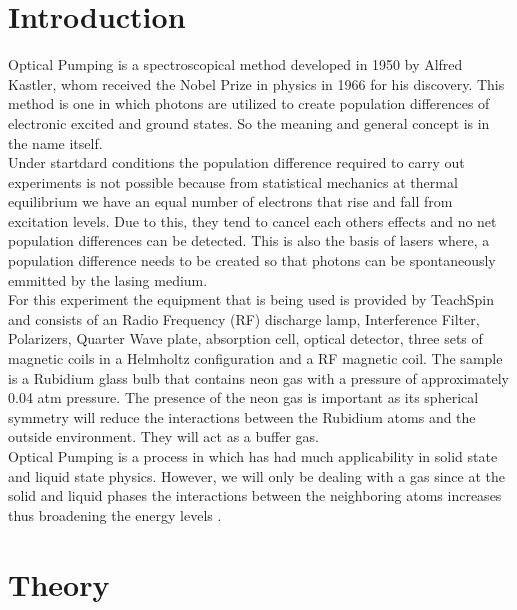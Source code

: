 \documentclass[twocolumn]{article}
\begin{document}
\section{Introduction}
Optical Pumping is a spectroscopical method developed in 1950 by Alfred 
Kastler, whom received the Nobel Prize in physics in 1966 for his discovery. 
This method is one in which photons are utilized to create population 
differences of electronic excited and ground states. So the meaning and general 
concept is in the name itself.
\\
Under startdard conditions the population difference required to carry out 
experiments is not possible because from statistical mechanics at thermal 
equilibrium we have an equal number of electrons that rise and fall from 
excitation levels. Due to this, they tend to cancel each others effects and 
no net population differences can be detected. This is also the basis of lasers 
where, a population difference needs to be created so that photons can be 
spontaneously emmitted by the lasing medium.
\\
For this experiment the equipment that is being used is provided by TeachSpin 
and consists of an Radio Frequency (RF) discharge lamp, Interference Filter, 
Polarizers, Quarter Wave plate, absorption cell, optical detector, three sets 
of magnetic coils in a Helmholtz configuration and a RF magnetic coil. The 
sample is a Rubidium glass bulb that contains neon gas with a pressure of 
approximately 0.04 atm pressure. The presence of the neon gas is important as 
its spherical symmetry will reduce the interactions between the Rubidium atoms 
and the outside environment. They will act as a buffer gas.
\\
Optical Pumping is a process in which has had much applicability in solid state 
and liquid state physics. However, we will only be dealing with a gas since at 
the solid and liquid phases the interactions between the neighboring atoms 
increases thus broadening the energy levels \cite{ref:1}.

\section{Theory}
\end{document}
